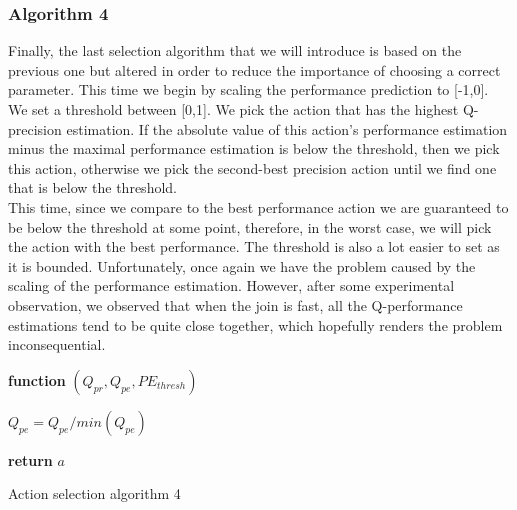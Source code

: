 \subsubsection{Algorithm 4}
Finally, the last selection algorithm that we will introduce is based on the previous one but altered in order to reduce the importance of choosing a correct parameter. This time we begin by scaling the performance prediction to [-1,0]. We set a threshold between [0,1]. We pick the action that has the highest Q-precision estimation. If the absolute value of this action's performance estimation minus the maximal performance estimation is below the threshold, then we pick this action, otherwise we pick the second-best precision action until we find one that is below the threshold.\\
This time, since we compare to the best performance action we are guaranteed to be below the threshold at some point, therefore, in the worst case, we will pick the action with the best performance. The threshold is also a lot easier to set as it is bounded. Unfortunately, once again we have the problem caused by the scaling of the performance estimation. However, after some experimental observation, we observed that when the join is fast, all the Q-performance estimations tend to be quite close together, which hopefully renders the problem inconsequential. 
\begin{center}
	\begin{algorithm}[H]

    \textbf{function}  $(Q_{pr},Q_{pe},PE_{thresh})$\;
    
    
    \Indp{}\Indm
    \Indp{} \Indm
    \Indp
    $Q_{pe} = Q_{pe}/min(Q_{pe})$\\
   
  
   \textbf{return} $a$
   
    
\caption{Action selection algorithm 4}
\end{algorithm}
\end{center}
